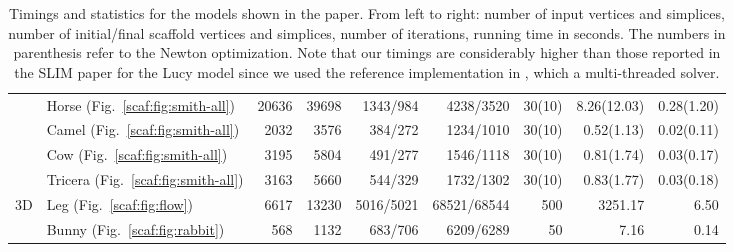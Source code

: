 \begin{table*}[t]
\begin{adjustbox}{width=\columnwidth,totalheight=\textheight,keepaspectratio}
\begin{tabular}{llrrrrrrr}
&Horse (Fig.~\ref{scaf:fig:smith-all}) & 20636 & 39698 & 1343/984 & 4238/3520 & 30(10) & 8.26(12.03) & 0.28(1.20) \\
&Camel (Fig.~\ref{scaf:fig:smith-all}) & 2032 & 3576 & 384/272 & 1234/1010 & 30(10) & 0.52(1.13) & 0.02(0.11) \\
&Cow (Fig.~\ref{scaf:fig:smith-all}) & 3195 & 5804 & 491/277 & 1546/1118 & 30(10) & 0.81(1.74) & 0.03(0.17) \\
&Tricera (Fig.~\ref{scaf:fig:smith-all}) & 3163 & 5660 & 544/329 & 1732/1302 & 30(10) & 0.83(1.77) & 0.03(0.18) \\
\hline

\multirow{2}{*}{3D}&Leg (Fig.~\ref{scaf:fig:flow})
&6617&13230&5016/5021&68521/68544&500&3251.17&6.50\\
&Bunny (Fig.~\ref{scaf:fig:rabbit})
&568&1132&683/706&6209/6289&50&7.16&0.14\\

\hline
	\end{tabular}
	\end{adjustbox}
			\caption{Timings and statistics for the models shown in the paper. From left to right: number of input vertices and simplices, number of initial/final scaffold vertices and simplices, number of iterations, running time in seconds. The numbers in parenthesis refer to the Newton optimization. Note that our timings are considerably higher than those reported in the SLIM paper for the Lucy model since we used the reference implementation in \protect\cite{libigl}, which  a multi-threaded solver.}
	\label{tab:timings}
	\vspace{-0.2cm}
\end{table*}
